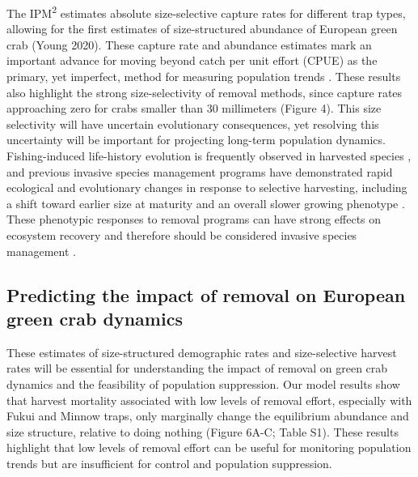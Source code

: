 \documentclass{article}
\begin{document}
The IPM\textsuperscript{2} estimates absolute size-selective capture rates for different trap types, allowing for the first estimates of size-structured abundance of European green crab (Young 2020). These capture rate and abundance estimates mark an important advance for moving beyond catch per unit effort (CPUE) as the primary, yet imperfect, method for measuring population trends \parencite{harley2001catch}. These results also highlight the strong size-selectivity of removal methods, since capture rates approaching zero for crabs smaller than 30 millimeters (Figure 4). This size selectivity will have uncertain evolutionary consequences, yet resolving this uncertainty will be important for projecting long-term population dynamics. Fishing-induced life-history evolution is frequently observed in harvested species \parencite{enberg2012fishing}, and previous invasive species management programs have demonstrated rapid ecological and evolutionary changes in response to selective harvesting, including a shift toward earlier size at maturity and an overall slower growing phenotype \parencite{evangelista2015impacts}. These phenotypic responses to removal programs can have strong effects on ecosystem recovery and therefore should be considered invasive species management \parencite{zavorka2020phenotypic}.


\subsection{Predicting the impact of removal on European green crab dynamics}

These estimates of size-structured demographic rates and size-selective harvest rates will be essential for understanding the impact of removal on green crab dynamics and the feasibility of population suppression. Our model results show that harvest mortality associated with low levels of removal effort, especially with Fukui and Minnow traps, only marginally change the equilibrium abundance and size structure, relative to doing nothing (Figure 6A-C; Table S1). These results highlight that low levels of removal effort can be useful for monitoring population trends but are insufficient for control and population suppression.
\end{document}
